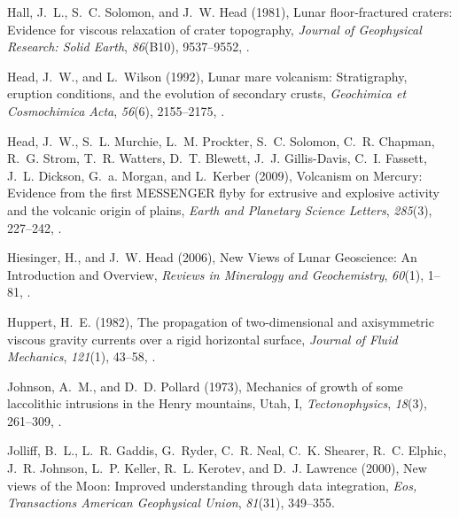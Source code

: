 \begin{article}
\begin{enumerate}
\begin{thebibliography}{39}
Hall, J.~L., S.~C. Solomon, and J.~W. Head (1981), {Lunar floor-fractured
  craters: Evidence for viscous relaxation of crater topography},
  \textit{Journal of Geophysical Research: Solid Earth}, \textit{86}(B10),
  9537--9552, .

Head, J.~W., and L.~Wilson (1992), {Lunar mare volcanism: Stratigraphy,
  eruption conditions, and the evolution of secondary crusts},
  \textit{Geochimica et Cosmochimica Acta}, \textit{56}(6), 2155--2175,
  .

Head, J.~W., S.~L. Murchie, L.~M. Prockter, S.~C. Solomon, C.~R. Chapman, R.~G.
  Strom, T.~R. Watters, D.~T. Blewett, J.~J. Gillis-Davis, C.~I. Fassett, J.~L.
  Dickson, G.~a. Morgan, and L.~Kerber (2009), {Volcanism on Mercury: Evidence
  from the first MESSENGER flyby for extrusive and explosive activity and the
  volcanic origin of plains}, \textit{Earth and Planetary Science Letters},
  \textit{285}(3), 227--242, .

Hiesinger, H., and J.~W. Head (2006), {New Views of Lunar Geoscience: An
  Introduction and Overview}, \textit{Reviews in Mineralogy and Geochemistry},
  \textit{60}(1), 1--81, .

Huppert, H.~E. (1982), {The propagation of two-dimensional and axisymmetric
  viscous gravity currents over a rigid horizontal surface}, \textit{Journal of
  Fluid Mechanics}, \textit{121}(1), 43--58, .

Johnson, A.~M., and D.~D. Pollard (1973), {Mechanics of growth of some
  laccolithic intrusions in the Henry mountains, Utah, I},
  \textit{Tectonophysics}, \textit{18}(3), 261--309,
  .

Jolliff, B.~L., L.~R. Gaddis, G.~Ryder, C.~R. Neal, C.~K. Shearer, R.~C.
  Elphic, J.~R. Johnson, L.~P. Keller, R.~L. Kerotev, and D.~J. Lawrence
  (2000), {New views of the Moon: Improved understanding through data
  integration}, \textit{Eos, Transactions American Geophysical Union},
  \textit{81}(31), 349--355.


\end{thebibliography}
\end{enumerate}
\end{article}
